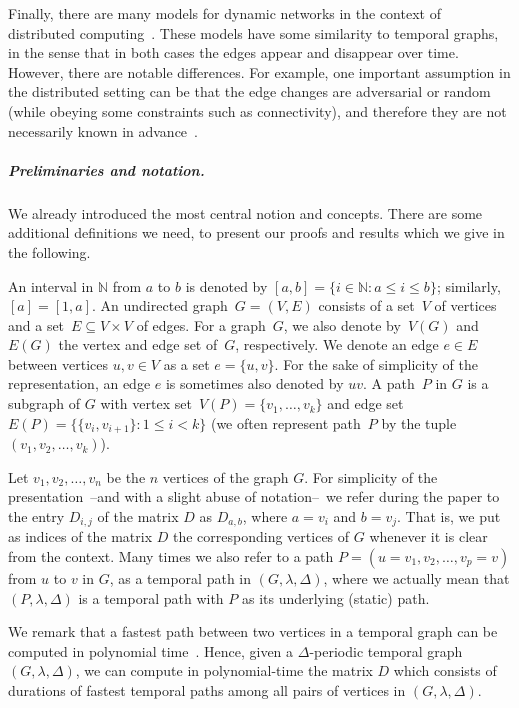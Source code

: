 \documentclass[a4paper,UKenglish,cleveref, autoref, thm-restate]{lipics-v2021}
\begin{document}
Finally, there are many models for dynamic networks in the context of distributed computing~\cite{Kuhn2011Dynamic}. 
These models have some similarity to temporal graphs, in the sense that in both cases the edges appear and disappear over time. 
However, there are notable differences. For example, one important assumption in the distributed setting 
can be that the edge changes are adversarial or random (while obeying some constraints such as connectivity), 
and therefore they are not necessarily known in advance~\cite{Kuhn2011Dynamic}. 




\subparagraph{Preliminaries and notation.}
We already introduced the most central notion and concepts. There are some additional definitions we need, to present our proofs and results which we give in the following. 

An interval in $\mathbb N$ from $a$ to $b$ is denoted by $[a,b] = \{ i\in \mathbb N  :  a \leq i \leq b\}$; similarly, $[a] = [1,a]$.
An undirected graph~$G=(V,E)$ consists of a set~$V$ of vertices 
and a set~$E \subseteq V \times V$ of edges.
For a graph~$G$, we also denote by~$V(G)$ and~$E(G)$ the vertex and edge set of~$G$, respectively.
We denote an edge $e \in E$ between vertices $u,v \in V$ as a set $e=\{u,v\}$.
For the sake of simplicity of the representation, an edge $e$ is sometimes also denoted by $uv$. 
A path~$P$ in $G$ is a subgraph of $G$ with vertex set~$V(P)=\{v_1,\dots,v_k\}$ and edge set~$E(P)=\{\{v_i,v_{i+1}\} :  1\leq i<k\}$
(we often represent path~$P$ by the tuple~$(v_1,v_2,\dots,v_k)$).





Let $v_1,v_2,\ldots,v_n$ be the $n$ vertices of the graph $G$. 
For simplicity of the presentation~--and with a slight abuse of notation--~we refer during the paper to the entry $D_{i,j}$ of the matrix $D$ as 
$D_{a,b}$, where $a=v_i$ and $b=v_j$. That is, we put as indices of the matrix $D$ the corresponding vertices of $G$ whenever it is clear from the context.
Many times we also refer to a path $P=(u=v_1, v_2, \dots, v_p=v)$ from $u$ to $v$ in $G$,
as a temporal path in $(G,\lambda,\Delta)$,
where we actually mean that $(P,\lambda,\Delta)$ is a temporal path with $P$ as its underlying (static) path.


We remark that a fastest path between two vertices in a temporal graph can be computed in polynomial time~\cite{xuan_computing_2003,Wu2016Efficient}.
Hence, given a $\Delta$-periodic temporal graph $(G,\lambda,\Delta)$, we can compute in polynomial-time  the matrix $D$
which consists of durations of fastest temporal paths among all pairs of vertices in $(G,\lambda,\Delta)$.
\end{document}
